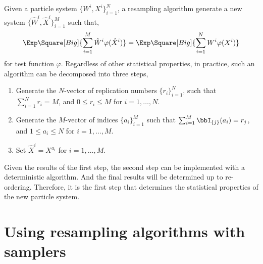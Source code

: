 Given a particle system $\{W^i,X^i\}_{i=1}^N$, a resampling algorithm
generate a new system $\{\hat{W}^i, \hat{X}^i\}_{i=1}^M$ such that,
\begin{equation*}
  \Exp\Square[Big]{\sum_{i=1}^M{\hat{W}^i\varphi(\hat{X}^i)}} = 
  \Exp\Square[Big]{\sum_{i=1}^N{W^i\varphi(X^i)}}
\end{equation*}
for test function $\varphi$. Regardless of other statistical properties, in
practice, such an algorithm can be decomposed into three steps,
\begin{enumerate}
  \item Generate the $N$-vector of replication numbers $\{r_i\}_{i=1}^N$, such
    that $\sum_{i=1}^N r_i = M$, and $0 \le r_i \le M$ for $i=1,\dots,N$.
  \item Generate the $M$-vector of indices $\{a_i\}_{i=1}^M$ such that
    $\sum_{i=1}^M \bbI_{\{j\}}(a_i) = r_j$, and $1 \le a_i \le N$ for $i =
    1,\dots,M$.
  \item Set $\hat{X}^i = X^{a_i}$ for $i = 1,\dots,M$.
\end{enumerate}
Given the results of the first step, the second step can be implemented with a
deterministic algorithm. And the final results will be determined up to
re-ordering. Therefore, it is the first step that determines the statistical
properties of the new particle system.

\section{Using resampling algorithms with samplers}
\label{sec:Using resampling algorithms with samplers}

